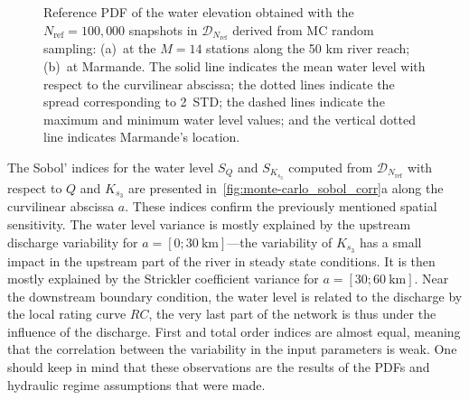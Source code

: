 \begin{figure}[!h]               
\centering
{} 
\caption{Reference PDF of the water elevation obtained with the $N_{\text{ref}} = 100,000$ snapshots in $\mathcal{D}_{N_{\text{ref}}}$ derived from MC random sampling: (a)~at the $M = 14$ stations along the 50 km river reach; (b)~at Marmande. The solid line indicates the mean water level with respect to the curvilinear abscissa; the dotted lines indicate the spread corresponding to 2~STD; the dashed lines indicate the maximum and minimum water level values; and the vertical dotted line indicates Marmande's location.}
\label{fig:monte-carlo_pdf}
\end{figure}

The Sobol' indices for the water level $S_Q$ and $S_{K_{s_3}}$ computed from $\mathcal{D}_{N_{\text{ref}}}$ with respect to $Q$ and $K_{s_3}$ are presented in~\cref{fig:monte-carlo_sobol_corr}a along the curvilinear abscissa $a$. These indices confirm the previously mentioned spatial sensitivity. The water level variance is mostly explained by the upstream discharge variability for $a = [0; 30~\text{km}]$---the variability of $K_{s_3}$ has a small impact in the upstream part of the river in steady state conditions. It is then mostly explained by the Strickler coefficient variance for $a = [30; 60~\text{km}]$. Near the downstream boundary condition, the water level is related to the discharge by the local rating curve $RC$, the very last part of the network is thus under the influence of the discharge. First and total order indices are almost equal, meaning that the correlation between the variability in the input parameters is weak. One should keep in mind that these observations are the results of the PDFs and hydraulic regime assumptions that were made.

